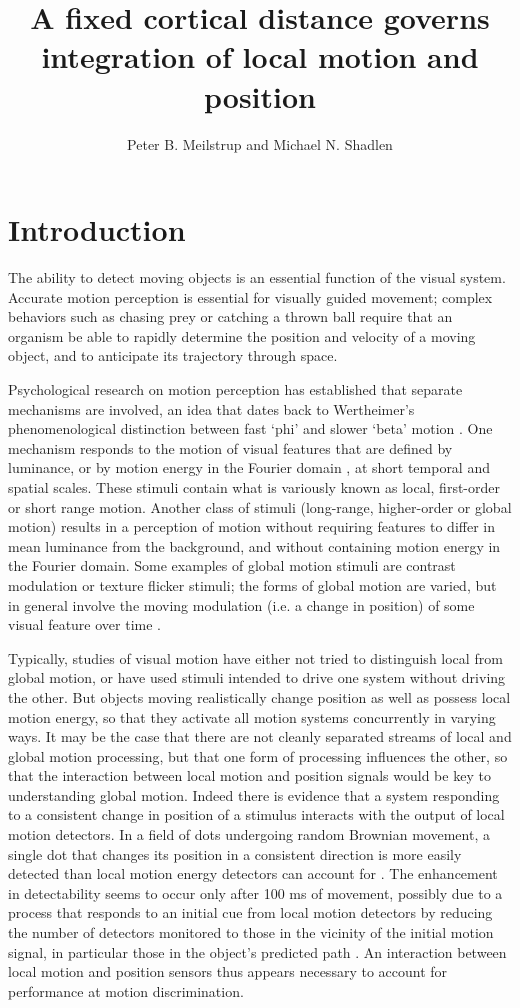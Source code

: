 \documentclass[11pt]{amsart}
\title{A fixed cortical distance governs integration of local motion and position}
\author{Peter B. Meilstrup and Michael N. Shadlen}
\date{} %
\begin{document}
\raggedright
\setlength{\parindent}{2em}
\maketitle
\section{Introduction}

The ability to detect moving objects is an essential function of the
visual system. Accurate motion perception is essential for visually
guided movement; complex behaviors such as chasing prey or catching a
thrown ball require that an organism be able to rapidly determine the
position and velocity of a moving object, and to anticipate its
trajectory through space.

Psychological research on motion perception has established that
separate mechanisms are involved, an idea that dates back to
Wertheimer's phenomenological distinction between fast `phi' and
slower `beta' motion \cite{Steinman:2000ap}. One mechanism responds to
the motion of visual features that are defined by luminance, or by
motion energy in the Fourier domain \cite{Adelson:1985ea}, at short
temporal and spatial scales. These stimuli contain what is variously
known as local, first-order or short range motion. Another class of
stimuli (long-range, higher-order or global motion) results in a
perception of motion without requiring features to differ in mean
luminance from the background, and without containing motion energy in
the Fourier domain. Some examples of global motion stimuli are
contrast modulation or texture flicker stimuli; the forms of global
motion are varied, but in general involve the moving modulation
(i.e. a change in position) of some visual feature over time
\cite{Lu:1995la}.

Typically, studies of visual motion have either not tried to
distinguish local from global motion, or have used stimuli intended to
drive one system without driving the other. But objects moving
realistically change position as well as possess local motion energy,
so that they activate all motion systems concurrently in varying
ways. It may be the case that there are not cleanly separated streams
of local and global motion processing, but that one form of processing
influences the other, so that the interaction between local motion and
position signals would be key to understanding global motion. Indeed
there is evidence that a system responding to a consistent change in
position of a stimulus interacts with the output of local motion
detectors. In a field of dots undergoing random Brownian movement, a
single dot that changes its position in a consistent direction is more
easily detected than local motion energy detectors can account for
\cite{Verghese:1999lq}. The enhancement in detectability seems to
occur only after 100 ms of movement, possibly due to a process that
responds to an initial cue from local motion detectors by reducing the
number of detectors monitored to those in the vicinity of the initial
motion signal, in particular those in the object's predicted path
\cite{VerghesePreeti2002}. An interaction between local motion and
position sensors thus appears necessary to account for performance at
motion discrimination.
\end{document}
